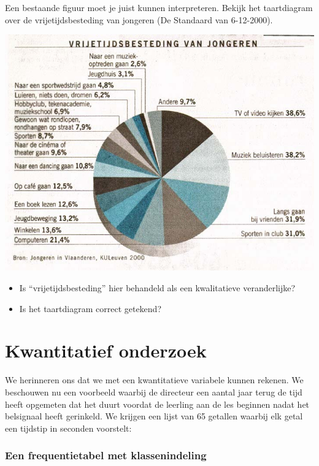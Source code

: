 \documentclass[12pt,twoside]{article}
\begin{document}
\begin{oefening}
Een bestaande figuur moet je juist kunnen interpreteren. Bekijk het taartdiagram over de
vrijetijdsbesteding van jongeren (De Standaard van 6-12-2000).

\begin{center}
  \includegraphics[width=1\textwidth]{cirkeldiagram-vrijetijdsbesteding}
\end{center}

\begin{itemize}
  \item Is “vrijetijdsbesteding” hier behandeld als een kwalitatieve veranderlijke?
  \item Is het taartdiagram correct getekend?
\end{itemize}
\end{oefening}

\section{Kwantitatief onderzoek}

We herinneren ons dat we met een kwantitatieve variabele kunnen rekenen. We beschouwen nu een voorbeeld waarbij de directeur een aantal jaar terug de tijd heeft opgemeten dat het duurt voordat de leerling aan de les beginnen nadat het belsignaal heeft gerinkeld. We krijgen een lijst van 65 getallen waarbij elk getal een tijdstip in seconden voorstelt:



\subsubsection{Een frequentietabel met klassenindeling}
\end{document}
